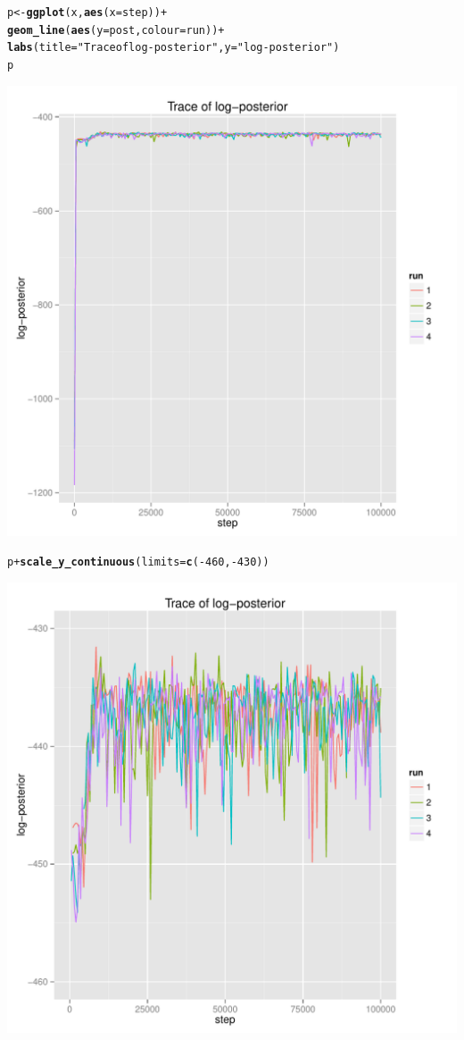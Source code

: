\documentclass{article}\usepackage[]{graphicx}\usepackage[]{color}
\makeatletter
\newcommand{\hlnum}[1]{\textcolor[rgb]{0.686,0.059,0.569}{#1}}%
\newcommand{\hlstr}[1]{\textcolor[rgb]{0.192,0.494,0.8}{#1}}%
\newcommand{\hlopt}[1]{\textcolor[rgb]{0,0,0}{#1}}%
\newcommand{\hlstd}[1]{\textcolor[rgb]{0.345,0.345,0.345}{#1}}%
\newcommand{\hlkwb}[1]{\textcolor[rgb]{0.69,0.353,0.396}{#1}}%
\newcommand{\hlkwc}[1]{\textcolor[rgb]{0.333,0.667,0.333}{#1}}%
\newcommand{\hlkwd}[1]{\textcolor[rgb]{0.737,0.353,0.396}{\textbf{#1}}}%
\newenvironment{kframe}{%
 \def\at@end@of@kframe{}%
 \ifinner\ifhmode%
  \def\at@end@of@kframe{\end{minipage}}%
  \begin{minipage}{\columnwidth}%
 \fi\fi%
 \def\FrameCommand##1{\hskip\@totalleftmargin \hskip-\fboxsep
 \colorbox{shadecolor}{##1}\hskip-\fboxsep
     \hskip-\linewidth \hskip-\@totalleftmargin \hskip\columnwidth}%
 \MakeFramed {\advance\hsize-\width
   \@totalleftmargin\z@ \linewidth\hsize
   \@setminipage}}%
 {\par\unskip\endMakeFramed%
 \at@end@of@kframe}
\newenvironment{knitrout}{}{} %
\makeatother
\begin{document}
\begin{knitrout}
\color{fgcolor}\begin{kframe}
\begin{alltt}
\hlstd{p} \hlkwb{<-} \hlkwd{ggplot}\hlstd{(x,} \hlkwd{aes}\hlstd{(}\hlkwc{x}\hlstd{=step))} \hlopt{+}
    \hlkwd{geom_line}\hlstd{(}\hlkwd{aes}\hlstd{(}\hlkwc{y}\hlstd{=post,} \hlkwc{colour}\hlstd{=run))} \hlopt{+}
    \hlkwd{labs}\hlstd{(}\hlkwc{title}\hlstd{=}\hlstr{"Trace of log-posterior"}\hlstd{,} \hlkwc{y}\hlstd{=}\hlstr{"log-posterior"}\hlstd{)}
\hlstd{p}
\end{alltt}
\end{kframe}

{\centering \includegraphics[width=.6\textwidth]{figs/unnamed-chunk-12} 

}



\end{knitrout}

\begin{knitrout}
\color{fgcolor}\begin{kframe}
\begin{alltt}
\hlstd{p} \hlopt{+} \hlkwd{scale_y_continuous}\hlstd{(}\hlkwc{limits}\hlstd{=}\hlkwd{c}\hlstd{(}\hlopt{-}\hlnum{460}\hlstd{,}\hlopt{-}\hlnum{430}\hlstd{))}
\end{alltt}
\end{kframe}

{\centering \includegraphics[width=.6\textwidth]{figs/unnamed-chunk-13} 

}



\end{knitrout}
\end{document}

